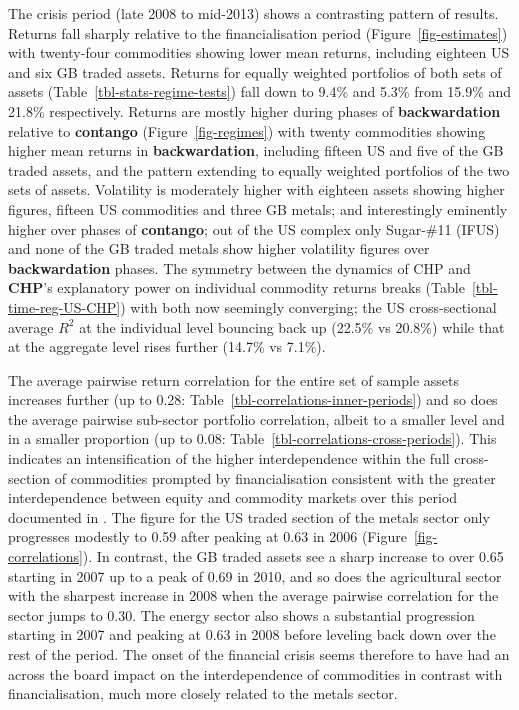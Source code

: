 \documentclass[
  authoryear,
  preprint,
  3p]{elsarticle}
\begin{document}
\bigskip
\bigskip

The crisis period (late 2008 to mid-2013) shows a contrasting pattern of
results. Returns fall sharply relative to the financialisation period
(Figure~\ref{fig-estimates}) with twenty-four commodities showing lower
mean returns, including eighteen US and six GB traded assets. Returns
for equally weighted portfolios of both sets of assets
(Table~\ref{tbl-stats-regime-tests}) fall down to 9.4\% and 5.3\% from
15.9\% and 21.8\% respectively. Returns are mostly higher during phases
of \textbf{backwardation} relative to \textbf{contango}
(Figure~\ref{fig-regimes}) with twenty commodities showing higher mean
returns in \textbf{backwardation}, including fifteen US and five of the
GB traded assets, and the pattern extending to equally weighted
portfolios of the two sets of assets. Volatility is moderately higher
with eighteen assets showing higher figures, fifteen US commodities and
three GB metals; and interestingly eminently higher over phases of
\textbf{contango}; out of the US complex only Sugar-\#11 (IFUS) and none
of the GB traded metals show higher volatility figures over
\textbf{backwardation} phases. The symmetry between the dynamics of CHP
and \textbf{CHP}'s explanatory power on individual commodity returns
breaks (Table~\ref{tbl-time-reg-US-CHP}) with both now seemingly
converging; the US cross-sectional average \(R^{2}\) at the individual
level bouncing back up (22.5\% vs 20.8\%) while that at the aggregate
level rises further (14.7\% vs 7.1\%).

\medskip

The average pairwise return correlation for the entire set of sample
assets increases further (up to 0.28:
Table~\ref{tbl-correlations-inner-periods}) and so does the average
pairwise sub-sector portfolio correlation, albeit to a smaller level and
in a smaller proportion (up to 0.08:
Table~\ref{tbl-correlations-cross-periods}). This indicates an
intensification of the higher interdependence within the full
cross-section of commodities prompted by financialisation consistent
with the greater interdependence between equity and commodity markets
over this period documented in
\citet{silvennoinen_financialisation_2013}. The figure for the US traded
section of the metals sector only progresses modestly to 0.59 after
peaking at 0.63 in 2006 (Figure~\ref{fig-correlations}). In contrast,
the GB traded assets see a sharp increase to over 0.65 starting in 2007
up to a peak of 0.69 in 2010, and so does the agricultural sector with
the sharpest increase in 2008 when the average pairwise correlation for
the sector jumps to 0.30. The energy sector also shows a substantial
progression starting in 2007 and peaking at 0.63 in 2008 before leveling
back down over the rest of the period. The onset of the financial crisis
seems therefore to have had an across the board impact on the
interdependence of commodities in contrast with financialisation, much
more closely related to the metals sector.
\end{document}
